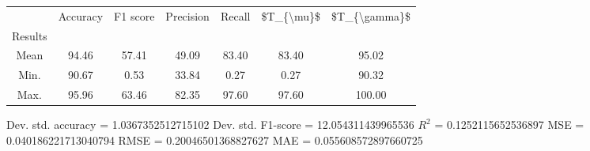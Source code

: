 \begin{tabular}{|c|c|c|c|c|c|c|}
\toprule
{} &  Accuracy &  F1 score &  Precision &  Recall &  \$T\_\{\textbackslash mu\}\$ &  \$T\_\{\textbackslash gamma\}\$ \\
Results &           &           &            &         &            &               \\
\hline
Mean    &     94.46 &     57.41 &      49.09 &   83.40 &      83.40 &         95.02 \\
Min.    &     90.67 &      0.53 &      33.84 &    0.27 &       0.27 &         90.32 \\
Max.    &     95.96 &     63.46 &      82.35 &   97.60 &      97.60 &        100.00 \\
\bottomrule
\end{tabular}

 Dev. std. accuracy = 1.0367352512715102
 Dev. std. F1-score = 12.054311439965536
 $R^2$ = 0.1252115652536897
 MSE = 0.040186221713040794
 RMSE = 0.20046501368827627
 MAE = 0.055608572897660725